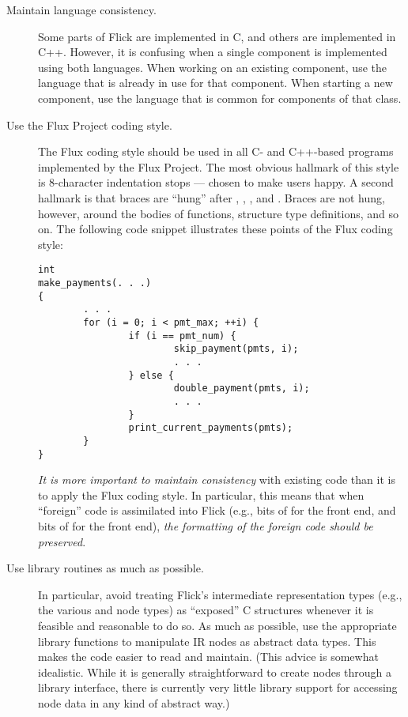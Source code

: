 \begin{description}
  \item[Maintain language consistency.]
  Some parts of Flick are implemented in C, and others are implemented in C++.
  However, it is confusing when a single component is implemented using both
  languages.  When working on an existing component, use the language that is
  already in use for that component.  When starting a new component, use the
  language that is common for components of that class.

  \item[Use the Flux Project coding style.]
  The Flux coding style should be used in all C- and C++-based programs
  implemented by the Flux Project.  The most obvious hallmark of this style is
  8-character indentation stops --- chosen to make  users happy.  A
  second hallmark is that braces are ``hung'' after ,
  , , and .  Braces are
  not hung, however, around the bodies of functions, structure type
  definitions, and so on.  The following code snippet illustrates these points
  of the Flux coding style:

\begin{verbatim}
int
make_payments(. . .)
{
        . . .
        for (i = 0; i < pmt_max; ++i) {
                if (i == pmt_num) {
                        skip_payment(pmts, i);
                        . . .
                } else {
                        double_payment(pmts, i);
                        . . .
                }
                print_current_payments(pmts);
        }
}
\end{verbatim}

  \emph{It is more important to maintain consistency} with existing code than
  it is to apply the Flux coding style.  In particular, this means that when
  ``foreign'' code is assimilated into Flick (e.g., bits of \rpcgen{} for the
  \ONCRPC{} front end, and bits of \MIG{} for the \MIG{} front end), \emph{the
  formatting of the foreign code should be preserved}.

  \item[Use library routines as much as possible.]
  In particular, avoid treating Flick's intermediate representation types
  (e.g., the various \AOI{} and \PRESC{} node types) as ``exposed'' C
  structures whenever it is feasible and reasonable to do so.  As much as
  possible, use the appropriate library functions to manipulate IR nodes as
  abstract data types.  This makes the code easier to read and maintain.  (This
  advice is somewhat idealistic.  While it is generally straightforward to
  create nodes through a library interface, there is currently very little
  library support for accessing node data in any kind of abstract way.)
\end{description}

